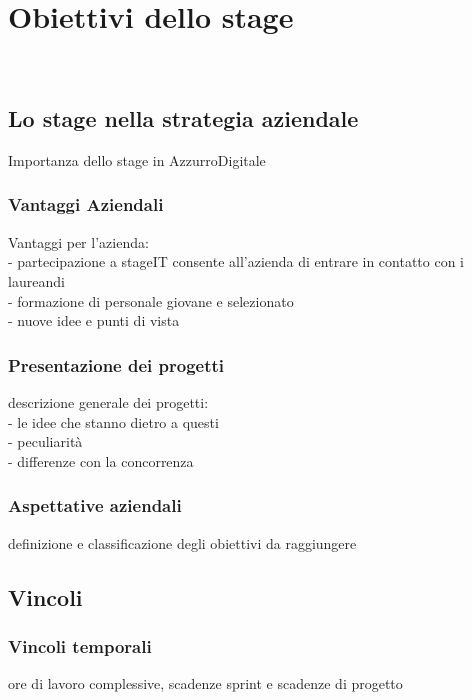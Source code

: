 \newpage
\chapter{Obiettivi dello stage}
\label{cap:obiettivi-stage}

\\

\section{Lo stage nella strategia aziendale}
Importanza dello stage in AzzurroDigitale
\subsection{Vantaggi Aziendali}
Vantaggi per l'azienda: \\
- partecipazione a stageIT consente all'azienda di entrare in contatto con i laureandi\\
- formazione di personale giovane e selezionato\\
- nuove idee e punti di vista \\

\subsection{Presentazione dei progetti}
descrizione generale dei progetti: \\
- le idee che stanno dietro a questi\\
- peculiarità\\
- differenze con la concorrenza\\
\subsection{Aspettative aziendali}
definizione e classificazione degli obiettivi da raggiungere

\section{Vincoli}
\subsection{Vincoli temporali}
ore di lavoro complessive, scadenze sprint e scadenze di progetto

